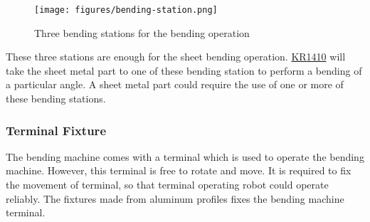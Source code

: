 \begin{figure}[h]
    \centering
    \texttt{[image: figures/bending-station.png]}
    \caption{Three bending stations for the bending operation}
    \label{fig:bending-station}
\end{figure}

These three stations are enough for the sheet bending operation. \hyperref[acro:KR]{KR1410} will take the sheet metal part to one of these bending station
to perform a bending of a particular angle. A sheet metal part could require the use of one or more of these bending stations.

\subsubsection{Terminal Fixture}
The bending machine comes with a terminal which is used to operate the bending machine. However, this terminal is free to rotate and move.
It is required to fix the movement of terminal, so that terminal operating robot could operate reliably. The fixtures made from aluminum profiles fixes the bending machine
terminal.

